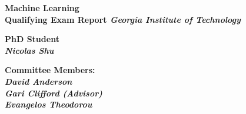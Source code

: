 \thispagestyle{empty}

\begin{center}
	\vfill
    \vspace*{0.2\textheight}

	\Huge
	\bf{Machine Learning \\Qualifying Exam Report}
	\it{Georgia Institute of Technology}
	\vskip 1cm

	\Large
	\bf{PhD Student} \\
	\it{Nicolas Shu} 
	\vskip 1cm


	\Large
	\bf{Committee Members:} \\
	\it{David Anderson} \\
	\it{Gari Clifford (Advisor)} \\
	\it{Evangelos Theodorou}

    \normalsize

\end{center}
